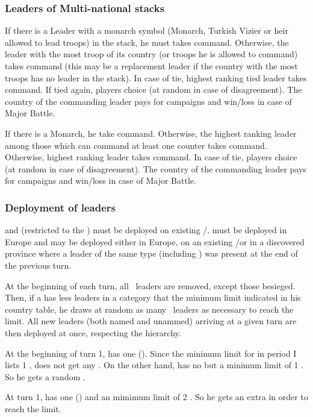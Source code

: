 \subsubsection{Leaders of Multi-national stacks}\label{chMilitary:multi national}
\aparag[On land]
\bparag If there is a Leader with a monarch symbol (Monarch, Turkish Vizier or
heir allowed to lead troops) in the stack, he must takes command.
\bparag Otherwise, the leader with the most troop of its country (or troops he
is allowed to command) takes command (this may be a replacement leader if the
country with the most troops has no leader in the stack).
\bparag In case of tie, highest ranking tied leader takes command.
\bparag If tied again, players choice (at random in case of disagreement).
\bparag The country of the commanding leader pays for campaigns and win/loss
\STAB in case of Major Battle.

\aparag[At sea]
\bparag If there is a Monarch, he take command.
\bparag Otherwise, the highest ranking leader among those which can command at
least one \FLEET counter takes command.
\bparag Otherwise, highest ranking leader takes command.
\bparag In case of tie, players choice (at random in case of disagreement).
\bparag The country of the commanding leader pays for campaigns and win/loss
\STAB in case of Major Battle.

\subsubsection{Deployment of leaders}%


\bparag \LeaderGov and \LeaderG (restricted to the \ROTW) must be deployed on
existing \COL/\TP.
\bparag \LeaderMis must be deployed in Europe
\bparag \LeaderE and \LeaderC may be deployed either in Europe, on an existing
\COL/\TP or in a discovered province where a leader of the same type
(including \anonyme) was present at the end of the previous turn.

\bparag At the beginning of each turn, all \MAJ \anonyme\ leaders are removed,
except those besieged.
\bparag Then, if a \MAJ has less leaders in a category that the minimum limit
indicated in his country table, he draws at random as many \anonyme\ leaders as
necessary to reach the limit.
\bparag All new leaders (both named and unammed) arriving at a given turn are
then deployed at once, respecting the hierarchy.
\begin{exemple}
  At the beginning of turn 1, \POR has one \LeaderE (). Since the
  minimum limit for \POR in period I lists 1 \LeaderE, \POR does not get any
  \anonyme\LeaderE. On the other hand, \POR has no \LeaderC but a minimum
  limit of 1 \LeaderC. So he gets a random \anonyme\LeaderC.

  At turn 1, \FRA has one \LeaderG () and an mimimum limit of 2
  \LeaderG. So he gets an extra \anonyme\LeaderG in order to reach the limit.
\end{exemple}

